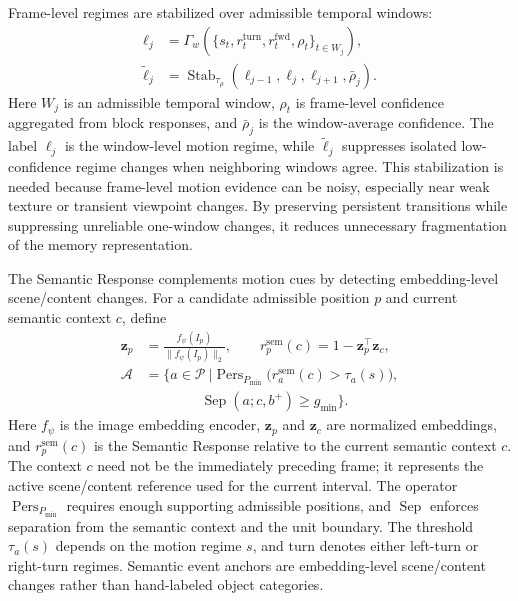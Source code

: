 Frame-level regimes are stabilized over admissible temporal windows:
\begin{equation}
\begin{aligned}
\ell_j
&=\Gamma_w(\{s_t,r_t^{\mathrm{turn}},
r_t^{\mathrm{fwd}},\rho_t\}_{t\in W_j}),\\
\widetilde{\ell}_j
&=\operatorname{Stab}_{\tau_\rho}
(\ell_{j-1},\ell_j,\ell_{j+1},\bar{\rho}_j).
\end{aligned}
\label{eq:window_stabilization}
\end{equation}
Here \(W_j\) is an admissible temporal window, \(\rho_t\) is frame-level confidence aggregated from block responses, and \(\bar{\rho}_j\) is the window-average confidence. The label \(\ell_j\) is the window-level motion regime, while \(\widetilde{\ell}_j\) suppresses isolated low-confidence regime changes when neighboring windows agree. This stabilization is needed because frame-level motion evidence can be noisy, especially near weak texture or transient viewpoint changes. By preserving persistent transitions while suppressing unreliable one-window changes, it reduces unnecessary fragmentation of the memory representation.

The Semantic Response complements motion cues by detecting embedding-level scene/content changes. For a candidate admissible position \(p\) and current semantic context \(c\), define
\begin{equation}
\begin{aligned}
\mathbf{z}_{p}
&=\frac{f_{\psi}(I_p)}{\|f_{\psi}(I_p)\|_2},
\qquad
r_p^{\mathrm{sem}}(c)=1-\mathbf{z}_{p}^{\top}\mathbf{z}_{c},\\
\mathcal{A}
&=\Big\{a\in\mathcal{P}\ \Big|
\operatorname{Pers}_{P_{\min}}
\big(r_a^{\mathrm{sem}}(c)>\tau_a(s)\big),\\
&\qquad\qquad
\operatorname{Sep}(a;c,b^+)\ge g_{\min}\Big\}.
\end{aligned}
\label{eq:semantic_anchor_admission}
\end{equation}
Here \(f_{\psi}\) is the image embedding encoder, \(\mathbf{z}_{p}\) and \(\mathbf{z}_{c}\) are normalized embeddings, and \(r_p^{\mathrm{sem}}(c)\) is the Semantic Response relative to the current semantic context \(c\). The context \(c\) need not be the immediately preceding frame; it represents the active scene/content reference used for the current interval. The operator \(\operatorname{Pers}_{P_{\min}}\) requires enough supporting admissible positions, and \(\operatorname{Sep}\) enforces separation from the semantic context and the unit boundary. The threshold \(\tau_a(s)\) depends on the motion regime \(s\), and \(\mathrm{turn}\) denotes either left-turn or right-turn regimes. Semantic event anchors are embedding-level scene/content changes rather than hand-labeled object categories.

